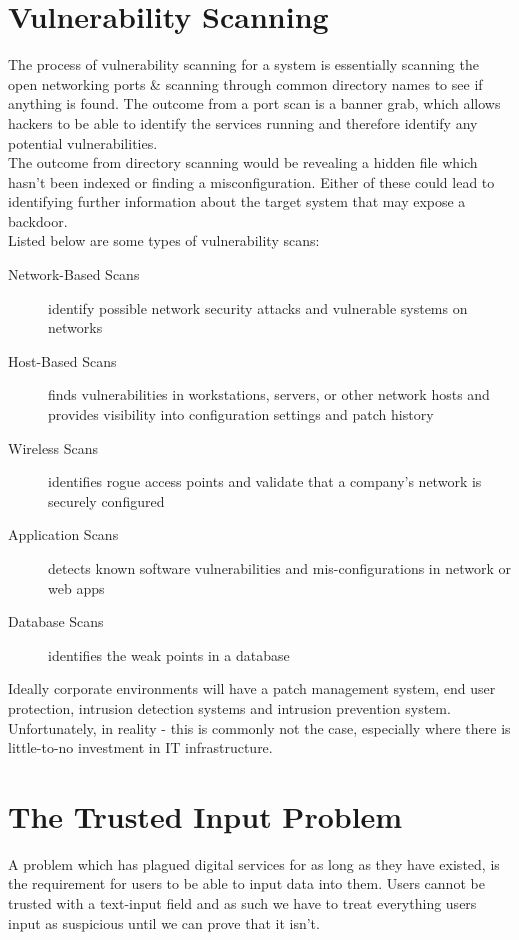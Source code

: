 
\section{Vulnerability Scanning}
The process of vulnerability scanning for a system is essentially scanning the open networking ports \& scanning through common directory names to see if anything is found. The outcome from a port scan is a banner grab, which allows hackers to be able to identify the services running and therefore identify any potential vulnerabilities.\\

The outcome from directory scanning would be revealing a hidden file which hasn't been indexed or finding a misconfiguration. Either of these could lead to identifying further information about the target system that may expose a backdoor.\\

Listed below are some types of vulnerability scans:
\begin{description}
    \item[Network-Based Scans] identify possible network security attacks and vulnerable systems on networks
    \item[Host-Based Scans] finds vulnerabilities in workstations, servers, or other network hosts and provides visibility into configuration settings and patch history
    \item[Wireless Scans] identifies rogue access points and validate that a company's network is securely configured
    \item[Application Scans] detects known software vulnerabilities and mis-configurations in network or web apps
    \item[Database Scans] identifies the weak points in a database
\end{description}

Ideally corporate environments will have a patch management system, end user protection, intrusion detection systems and intrusion prevention system. Unfortunately, in reality - this is commonly not the case, especially where there is little-to-no investment in IT infrastructure.

\section{The Trusted Input Problem}
A problem which has plagued digital services for as long as they have existed, is the requirement for users to be able to input data into them. Users cannot be trusted with a text-input field and as such we have to treat everything users input as suspicious until we can prove that it isn't.\\

